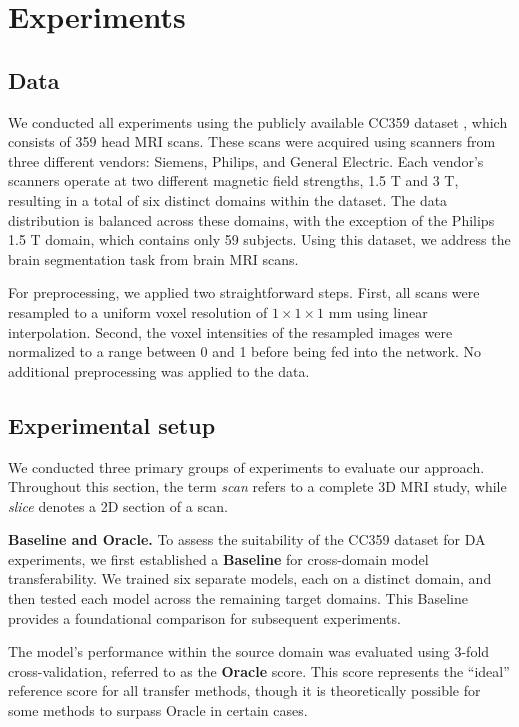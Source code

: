 \section{Experiments}


\subsection{Data}

We conducted all experiments using the publicly available CC359 dataset \cite{souza2018open}, which consists of 359 head MRI scans. These scans were acquired using scanners from three different vendors: Siemens, Philips, and General Electric. Each vendor's scanners operate at two different magnetic field strengths, 1.5 T and 3 T, resulting in a total of six distinct domains within the dataset. The data distribution is balanced across these domains, with the exception of the Philips 1.5 T domain, which contains only 59 subjects. Using this dataset, we address the brain segmentation task from brain MRI scans.

For preprocessing, we applied two straightforward steps. First, all scans were resampled to a uniform voxel resolution of $1 \times 1 \times 1$ mm using linear interpolation. Second, the voxel intensities of the resampled images were normalized to a range between 0 and 1 before being fed into the network. No additional preprocessing was applied to the data.


\subsection{Experimental setup}

We conducted three primary groups of experiments to evaluate our approach. Throughout this section, the term \textit{scan} refers to a complete 3D MRI study, while \textit{slice} denotes a 2D section of a scan.

\textbf{Baseline and Oracle.} To assess the suitability of the CC359 dataset for DA experiments, we first established a \textbf{Baseline} for cross-domain model transferability. We trained six separate models, each on a distinct domain, and then tested each model across the remaining target domains. This Baseline provides a foundational comparison for subsequent experiments.

The model's performance within the source domain was evaluated using 3-fold cross-validation, referred to as the \textbf{Oracle} score. This score represents the ``ideal'' reference score for all transfer methods, though it is theoretically possible for some methods to surpass Oracle in certain cases.

